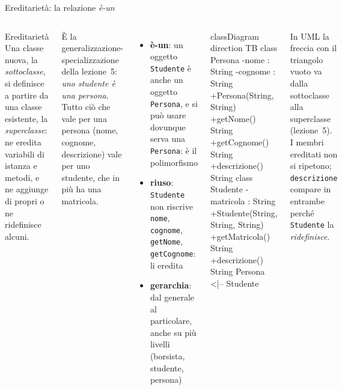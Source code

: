 \documentclass[10pt,aspectratio=169]{beamer}
\begin{document}
\begin{frame}[fragile]{Ereditarietà: la relazione \emph{è-un}}
\begin{columns}[T]
\begin{block}{Ereditarietà}
\small Una classe nuova, la \emph{sottoclasse}, si definisce a partire da una classe esistente, la \emph{superclasse}: ne eredita variabili di istanza e metodi, e ne aggiunge di propri o ne ridefinisce alcuni.
\end{block}

\small
È la generalizzazione-specializzazione della lezione~5: \emph{uno studente è una persona}. Tutto ciò che vale per una persona (nome, cognome, descrizione) vale per uno studente, che in più ha una matricola.

\vspace{0.1cm}
\begin{itemize}\itemsep=3pt
    \item \textbf{è-un}: un oggetto \texttt{Studente} è anche un oggetto \texttt{Persona}, e si può usare dovunque serva una \texttt{Persona}: è il polimorfismo
    \item \textbf{riuso}: \texttt{Studente} non riscrive \texttt{nome}, \texttt{cognome}, \texttt{getNome}, \texttt{getCognome}: li eredita
    \item \textbf{gerarchia}: dal generale al particolare, anche su più livelli (borsista, studente, persona)
\end{itemize}

\begin{mermaid}
classDiagram
  direction TB
  class Persona {
    -nome : String
    -cognome : String
    +Persona(String, String)
    +getNome() String
    +getCognome() String
    +descrizione() String
  }
  class Studente {
    -matricola : String
    +Studente(String, String, String)
    +getMatricola() String
    +descrizione() String
  }
  Persona <|-- Studente
\end{mermaid}
\footnotesize
In UML la freccia con il triangolo vuoto va dalla sottoclasse alla superclasse (lezione~5). I membri ereditati non si ripetono; \texttt{descrizione} compare in entrambe perché \texttt{Studente} la \emph{ridefinisce}.
\end{columns}
\end{frame}
\end{document}
